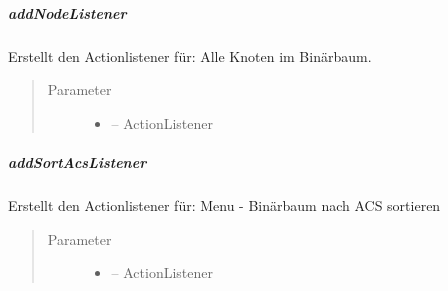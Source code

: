 \documentclass[letterpaper,10pt,ngerman]{sphinxmanual}
\begin{document}
\subparagraph{addNodeListener}
\label{\detokenize{com/linuxluigi/edu/view/View:addnodelistener}}

\begin{fulllineitems}
\label{\detokenize{com/linuxluigi/edu/view/View:com.linuxluigi.edu.view.View.addNodeListener(ActionListener)}}
Erstellt den Actionlistener für: Alle Knoten im Binärbaum.
\begin{quote}\begin{description}
\item[{Parameter}] \leavevmode\begin{itemize}
\item {} 
 -- ActionListener

\end{itemize}

\end{description}\end{quote}

\end{fulllineitems}



\subparagraph{addSortAcsListener}
\label{\detokenize{com/linuxluigi/edu/view/View:addsortacslistener}}

\begin{fulllineitems}
\label{\detokenize{com/linuxluigi/edu/view/View:com.linuxluigi.edu.view.View.addSortAcsListener(ActionListener)}}
Erstellt den Actionlistener für: Menu - Binärbaum nach ACS sortieren
\begin{quote}\begin{description}
\item[{Parameter}] \leavevmode\begin{itemize}
\item {} 
 -- ActionListener

\end{itemize}

\end{description}\end{quote}

\end{fulllineitems}
\end{document}
